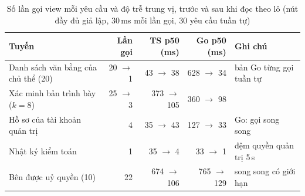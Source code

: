 \begin{table}[H]
\centering
\caption{Số lần gọi view mỗi yêu cầu và độ trễ trung vị, trước và sau khi đọc theo lô (nút đầy đủ giả lập, 30\,ms mỗi lần gọi, 30 yêu cầu tuần tự)}
\label{tab:v2-perf-views}
\renewcommand{\arraystretch}{1.2}
\small
\begin{tabular}{|p{4.0cm}|r|r|r|p{2.9cm}|}
\hline
\textbf{Tuyến} & \textbf{Lần gọi} & \textbf{TS p50 (ms)} & \textbf{Go p50 (ms)} & \textbf{Ghi chú} \\ \hline
Danh sách văn bằng của chủ thể (20) & 20 $\to$ 1 & 43 $\to$ 38 & 628 $\to$ 34 & bản Go từng gọi tuần tự \\ \hline
Xác minh bản trình bày ($k=8$) & 25 $\to$ 3 & 373 $\to$ 105 & 360 $\to$ 98 & \\ \hline
Hồ sơ của tài khoản quản trị & 4 & 35 $\to$ 43 & 127 $\to$ 33 & Go: gọi song song \\ \hline
Nhật ký kiểm toán & 1 & 35 $\to$ 4 & 33 $\to$ 1 & đệm quyền quản trị 5\,s \\ \hline
Bên được uỷ quyền (10) & 22 & 674 $\to$ 106 & 765 $\to$ 129 & song song có giới hạn \\ \hline
\end{tabular}
\end{table}

